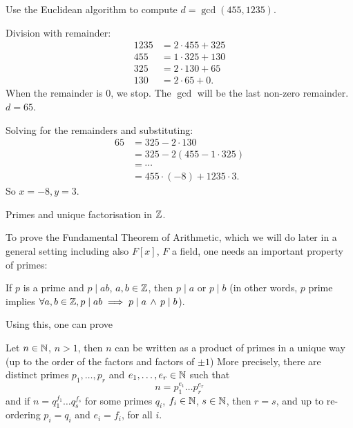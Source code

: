 \documentclass[10pt, a4paper]{article}
\begin{document}
\begin{example}
    Use the Euclidean algorithm to compute $d = \gcd(455, 1235)$.

    \begin{solution}
        Division with remainder:
        \begin{align*}
            1235 &= 2 \cdot 455 + 325 \\
            455 &= 1 \cdot 325 + 130 \\
            325 &= 2 \cdot 130 + 65 \\
            130 &= 2 \cdot 65 + 0.
        \end{align*}
        When the remainder is $0$,
        we stop.
        The $\gcd$ will be the last non-zero remainder.
        $d = 65$.

        Solving for the remainders and substituting:
        \begin{align*}
            65 &= 325 - 2 \cdot 130 \\
            &= 325 - 2(455 - 1 \cdot 325) \\
            &= \dotsi \\
            &= 455 \cdot (-8) + 1235 \cdot 3.
        \end{align*}
        So $x = -8, y = 3$.
    \end{solution}
\end{example}

Primes and unique factorisation in $\mathbb{Z}$.

To prove the Fundamental Theorem of Arithmetic,
which we will do later in a general setting including also $F[x]$,
$F$ a field,
one needs an important property of primes:

\begin{lemma}\label{algII:lem:primedivmultthendivfacts}
    If $p$ is a prime and $p \mid ab$,
    $a, b \in \mathbb{Z}$,
    then $p \mid a$ or $p \mid b$
    (in other words,
    $p$ prime implies $\forall a, b \in \mathbb{Z}, p \mid ab \implies p \mid a\,\wedge\,p \mid b$).
\end{lemma}

Using this,
one can prove

\begin{theorem}
    Let $n \in \mathbb{N}$,
    $n > 1$,
    then $n$ can be written as a product of primes in a unique way
    (up to the order of the factors and factors of $\pm 1$)
    More precisely,
    there are distinct primes $p_1, \dotsc, p_r$ and $e_1, \dotsc, e_r \in \mathbb{N}$ such that
    \[
    n = p_1 ^ {e_1} \dots p_r ^ {e_r}
    \]
    and if $n = q_1 ^ {f_1} \dots q_s ^ {f_s}$ for some primes $q_i$,
    $f_i \in \mathbb{N}$,
    $s \in \mathbb{N}$,
    then $r = s$,
    and up to re-ordering $p_i = q_i$ and $e_i = f_i$,
    for all $i$.
\end{theorem}
\end{document}
